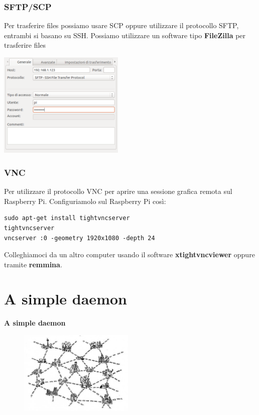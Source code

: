 \documentclass[xcolor=svgnames,11pt]{beamer}
\begin{document}
\begin{frame}\frametitle{SFTP/SCP}
Per trasferire files possiamo usare SCP oppure utilizzare il protocollo SFTP, entrambi si basano su SSH. Possiamo utilizzare un software tipo \textbf{FileZilla} per trasferire files
\medskip
\begin{center}
\includegraphics[width=6cm]{filezilla.png}
\end{center}
\end{frame}

\begin{frame}[fragile]\frametitle{VNC}
Per utilizzare il protocollo VNC per aprire una sessione grafica remota sul Raspberry Pi. Configuriamolo sul Raspberry Pi cos\`i:
\medskip
\begin{block}{}
\begin{verbatim}
sudo apt-get install tightvncserver
tightvncserver
vncserver :0 -geometry 1920x1080 -depth 24
\end{verbatim}
\end{block}
\medskip
Colleghiamoci da un altro computer usando il software \textbf{xtightvncviewer} oppure tramite \textbf{remmina}.
\end{frame}


\section{A simple daemon}
\begin{frame}{}
\begin{center}
\begin{Huge}
{\color{green_raspi} \textbf{A simple daemon}}
\end{Huge}
\begin{figure}
\includegraphics[height=4cm]{meme6.jpg}
\end{figure}
\end{center}
\end{frame}
\end{document}
